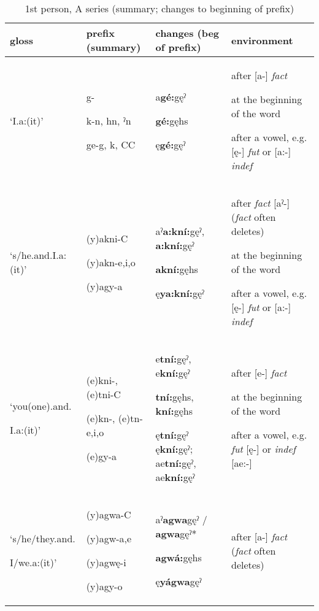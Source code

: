 

\begin{table}
\caption{1st person, A series (summary; changes to beginning of prefix)}
\label{tab:1:1apron}
\tiny{
\begin{tabularx}{\textwidth}{XXXX}
\lsptoprule
gloss & prefix (summary) & changes (beg of prefix) & environment\\
\midrule
‘I.a:(it)’ & g-

k-n, hn, ˀn

ge-g, k, CC & a\textbf{gé:}gęˀ

\textbf{gé:}gęhs

ę\textbf{gé:}gęˀ & after [a-] \textit{fact}

at the beginning of the word 

after a vowel, e.g. [ę-] \textit{fut} or [a:-] \textit{indef}\\
‘s/he.and.I.a:(it)’ & (y)akni-C

(y)akn-e,i,o

(y)agy-a & aˀ\textbf{a:kní:}gęˀ, \textbf{a:kní:}gęˀ

\textbf{akní:}gęhs

ę\textbf{ya:kní:}gęˀ & after \textit{fact} [aˀ-] (\textit{fact} often deletes)

at the beginning of the word 

after a vowel, e.g. [ę-] \textit{fut} or [a:-] \textit{indef}\\
‘you(one).and.

I.a:(it)’ & (e)kni-, (e)tni-C

(e)kn-, (e)tn-e,i,o

(e)gy-a & e\textbf{tní:}gęˀ,  e\textbf{kní:}gęˀ

\textbf{tní:}gęhs, \textbf{kní:}gęhs

ę\textbf{tní:}gęˀ  ę\textbf{kní:}gęˀ; ae\textbf{tní:}gęˀ, ae\textbf{kní:}gęˀ & after [e-] \textit{fact}

at the beginning of the word 

after a vowel, e.g. \textit{fut} [ę-] or \textit{indef} [ae:-] \\
‘s/he/they.and.

I/we.a:(it)’ & (y)agwa-C

(y)agw-a,e

(y)agwę-i

(y)agy-o & aˀ\textbf{agwa}gęˀ / \textbf{agwa}gęˀ*

\textbf{agwá:}gęhs

ę\textbf{yágwa}gęˀ & after [a-] \textit{fact} (\textit{fact} often deletes)


\end{tabularx}}
\end{table}
